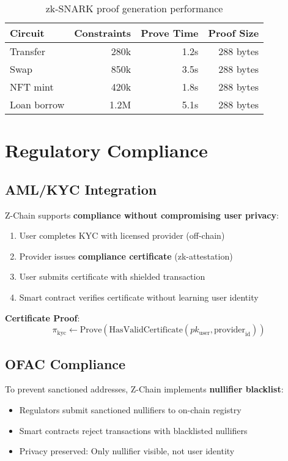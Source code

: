 \documentclass[11pt]{article}
\begin{document}
\begin{table}[h]
\centering
\begin{tabular}{lrrr}
\toprule
Circuit & Constraints & Prove Time & Proof Size \\
\midrule
Transfer & 280k & 1.2s & 288 bytes \\
Swap & 850k & 3.5s & 288 bytes \\
NFT mint & 420k & 1.8s & 288 bytes \\
Loan borrow & 1.2M & 5.1s & 288 bytes \\
\bottomrule
\end{tabular}
\caption{zk-SNARK proof generation performance}
\end{table}

\section{Regulatory Compliance}

\subsection{AML/KYC Integration}

Z-Chain supports \textbf{compliance without compromising user privacy}:

\begin{enumerate}
  \item User completes KYC with licensed provider (off-chain)
  \item Provider issues \textbf{compliance certificate} (zk-attestation)
  \item User submits certificate with shielded transaction
  \item Smart contract verifies certificate without learning user identity
\end{enumerate}

\textbf{Certificate Proof}:
\begin{equation}
\pi_{\text{kyc}} \leftarrow \text{Prove}\left(\text{HasValidCertificate}(pk_{\text{user}}, \text{provider}_{\text{id}})\right)
\end{equation}

\subsection{OFAC Compliance}

To prevent sanctioned addresses, Z-Chain implements \textbf{nullifier blacklist}:

\begin{itemize}[leftmargin=1.1em]
  \item Regulators submit sanctioned nullifiers to on-chain registry
  \item Smart contracts reject transactions with blacklisted nullifiers
  \item Privacy preserved: Only nullifier visible, not user identity
\end{itemize}
\end{document}
